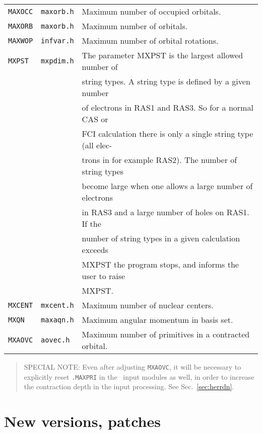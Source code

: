 \bigskip

\begin{tabular}{lll}
\verb|MAXOCC| & \verb|maxorb.h| & Maximum number of occupied
orbitals.\index{occupied orbitals}\index{limits}\\
\verb|MAXORB| & \verb|maxorb.h| & Maximum number of
orbitals.\index{orbitals}\index{limits}\\
\verb|MAXWOP| & \verb|infvar.h| & Maximum number of orbital
rotations.\index{orbital rotations}\index{limits}\\
\verb|MXPST| & \verb|mxpdim.h| & The parameter MXPST is the largest
allowed number\index{string numbers}\index{limits} of \\ && string types.
A string type is defined by a given number \\&& of electrons in RAS1 and
RAS3. So for a normal CAS or \\ &&  FCI calculation there is only a
single string
type (all elec-\\&&trons in for example RAS2). The number of string types
 \\ & & become large when one allows a large number of electrons
 \\ &&  in  RAS3  and a large number of holes on RAS1. If the
 \\ && number of  string types
in a given calculation exceeds  \\&&  MXPST the program stops, and
informs the user to raise\\&& MXPST.\\
\verb|MXCENT| & \verb|mxcent.h| & Maximum number of nuclear
centers.\index{atomic centers}\index{limits}\\
\verb|MXQN| & \verb|maxaqn.h| & Maximum angular momentum in basis
set.\index{angular momentum}\index{limits}\\
\verb|MXAOVC| & \verb|aovec.h| & Maximum number of primitives in a
contracted orbital.\index{primitive orbitals}\index{limits}
\end{tabular}

\begin{quote}
SPECIAL NOTE: Even after adjusting \verb|MXAOVC|, it will be
necessary to explicitly reset \verb|.MAXPRI| in the
\her\ input modules as well, in order to increase the contraction depth
in the input processing.  See Sec.~\ref{sec:herrdn}.
\end{quote}

\section{New versions, patches}

